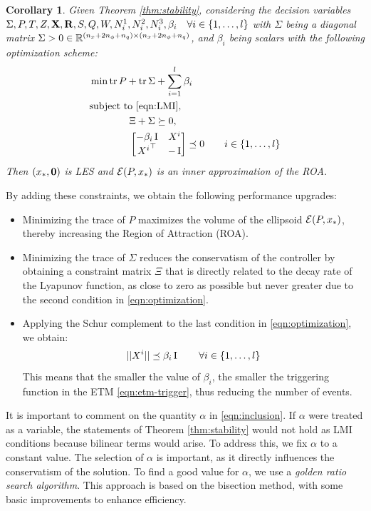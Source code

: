 \documentclass{ifacconf}
\theoremstyle{plain}
\newtheorem{corollary}{Corollary}
\begin{document}
\begin{corollary}\label{cor:optimization}
  \emph{Given Theorem \ref{thm:stability}, considering the decision variables $\Sigma, P, T, Z, {\bf{X}}, {\bf{R}}, S, Q, W, N^1_i, N^2_i, N^3_i, \beta_i \quad \forall i \in \left\{ 1, \dots, l \right\}$ with $\Sigma$ being a diagonal matrix $\Sigma > 0 \in {\mathbb{R}}^{(n_x + 2 n_{\phi} + n_q) \times (n_x + 2 n_{\phi} + n_q)}$, and $\beta_i$ being scalars with the following optimization scheme:}
  \begin{equation}\label{eqn:optimization}
  \begin{aligned}
    &\min \operatorname{tr}{P} + \operatorname{tr}{\Sigma} + \sum_{i=1}^{l} \beta_i\\
    &\text{subject to } \eqref{eqn:LMI},\\ 
    &\qquad \qquad \Xi + \Sigma \succeq 0,\\
    &\qquad \qquad \left[\begin{matrix}-\beta_i \operatorname{I} & X^i\\
    {X^i}^\top & -\operatorname{I}\end{matrix}\right] \preceq 0 \qquad i \in \left\{ 1, \dots, l \right\}
  \end{aligned}
  \end{equation}
  \emph{Then $(x_*, \operatorname{\mathbf{0}})$ is LES and ${\mathcal{E}}(P, x_*)$ is an inner approximation of the ROA.}
\end{corollary}

By adding these constraints, we obtain the following performance upgrades:
\begin{itemize}
  \item Minimizing the trace of $P$ maximizes the volume of the ellipsoid ${\mathcal{E}}(P, x_*)$, thereby increasing the Region of Attraction (ROA).
  \item Minimizing the trace of $\Sigma$ reduces the conservatism of the controller by obtaining a constraint matrix $\Xi$ that is directly related to the decay rate of the Lyapunov function, as close to zero as possible but never greater due to the second condition in \eqref{eqn:optimization}.
  \item Applying the Schur complement to the last condition in \eqref{eqn:optimization}, we obtain:
  $$
  || X^i || \preceq \beta_i \operatorname{I} \qquad \forall i \in \left\{1, \dots, l \right\}
  $$
 This means that the smaller the value of $\beta_i$, the smaller the triggering function in the ETM \eqref{eqn:etm-trigger}, thus reducing the number of events.
\end{itemize}

It is important to comment on the quantity $\alpha$ in \eqref{eqn:inclusion}. If $\alpha$ were treated as a variable, the statements of Theorem \ref{thm:stability} would not hold as LMI conditions because bilinear terms would arise. To address this, we fix $\alpha$ to a constant value. The selection of $\alpha$ is important, as it directly influences the conservatism of the solution. To find a good value for $\alpha$, we use a \emph{golden ratio search algorithm}. This approach is based on the bisection method, with some basic improvements to enhance efficiency.
\end{document}
